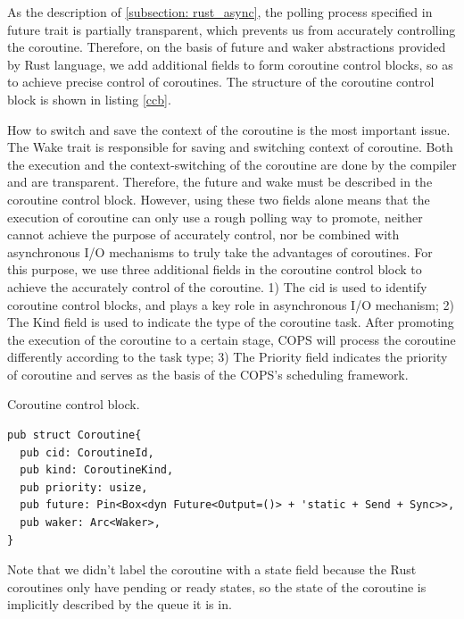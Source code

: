\documentclass[sigconf,review,anonymous]{acmart}
\begin{document}
As the description of \ref{subsection: rust_async}, the polling process specified in future trait is partially transparent, which prevents us from accurately controlling the coroutine. Therefore, on the basis of future and waker abstractions provided by Rust language, we add additional fields to form coroutine control blocks, so as to achieve precise control of coroutines. The structure of the coroutine control block is shown in listing \ref{ccb}.

How to switch and save the context of the coroutine is the most important issue. The Wake trait is responsible for saving and switching context of coroutine. Both the execution and the context-switching of the coroutine are done by the compiler and are transparent. Therefore, the future and wake must be described in the coroutine control block. However, using these two fields alone means that the execution of coroutine can only use a rough polling way to promote, neither cannot achieve the purpose of accurately control, nor be combined with asynchronous I/O mechanisms to truly take the advantages of coroutines. For this purpose, we use three additional fields in the coroutine control block to achieve the accurately control of the coroutine. 1) The cid is used to identify coroutine control blocks, and plays a key role in asynchronous I/O mechanism; 2) The Kind field is used to indicate the type of the coroutine task. After promoting the execution of the coroutine to a certain stage, COPS will process the coroutine differently according to the task type; 3) The Priority field indicates the priority of coroutine and serves as the basis of the COPS's scheduling framework.

\begin{listing}
\caption{Coroutine control block.}
\label{ccb}
\begin{mdframed}
\begin{verbatim}
pub struct Coroutine{
  pub cid: CoroutineId,
  pub kind: CoroutineKind,
  pub priority: usize,
  pub future: Pin<Box<dyn Future<Output=()> + 'static + Send + Sync>>, 
  pub waker: Arc<Waker>,
}
\end{verbatim}
\end{mdframed}
\end{listing}

Note that we didn't label the coroutine with a state field because the Rust coroutines only have pending or ready states, so the state of the coroutine is implicitly described by the queue it is in.
\end{document}
